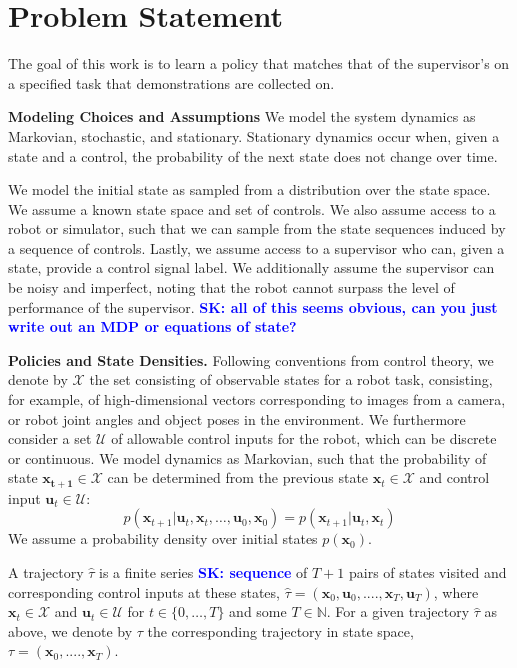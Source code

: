 \documentclass[10pt, conference]{ieeeconf}      %
\newcommand{\bu}{\mathbf{u}}
\newcommand{\bx}{\mathbf{x}}
\newcommand{\sknote}[1]{%
 {\textcolor{blue}{\textbf{SK: #1}}}{}}
\begin{document}
\section{Problem Statement}\label{sec:PS}
The goal of this work is to learn a policy that matches that of the supervisor's on a specified task that demonstrations are collected on. 

\noindent\textbf{Modeling Choices and Assumptions}  We model the system dynamics as Markovian, stochastic, and stationary. Stationary dynamics occur when, given a state and a control, the probability of the next state does not change over time. 

We model the initial state as sampled from a distribution over the state space.
We assume a known state space and set of controls. We also assume access to a robot or simulator, such that we  can sample from the state sequences induced by a sequence of controls.   Lastly, we assume access to a supervisor who can, given a state, provide a control signal label. We additionally assume the supervisor can be noisy and imperfect, noting that the robot cannot surpass the level of performance of the supervisor. 
\sknote{all of this seems obvious, can you just write out an MDP or equations of state?}


\noindent\textbf{Policies and State Densities.}
Following conventions from control theory, we denote by $\mathcal{X}$ the set consisting of observable states for a robot task, consisting, for example, of 
high-dimensional vectors corresponding to images from a camera, or robot joint angles and object poses in the environment.
We furthermore consider a set $\mathcal{U}$ of allowable control inputs for the robot, which can be discrete or
continuous. We model dynamics as Markovian, such that the probability of state $\mathbf{x_{t+1}}\in
\mathcal{X}$ can be determined from the previous state $\mathbf{x}_t\in\mathcal{X}$ and control input $\mathbf{u}_t\in
\mathcal{U}$: 
$$p(\bx_{t+1}|\bu_{t},\bx_{t}, \ldots, \bu_{0}, \bx_{0})=p(\bx_{t+1}|\bu_{t}, \bx_t)$$
We assume a probability density over initial states $p(\bx_0)$.



A trajectory $\hat{\tau}$ is a finite series\sknote{sequence} of $T+1$ pairs of states visited and corresponding
control inputs at these states, $\hat{\tau} = (\mathbf{x}_0,\mathbf{u}_0, ...., \mathbf{x}_T,\mathbf{u}_T)$, where $\bx_t\in \mathcal{X}$
and $\bu_t\in \mathcal{U}$ for $t\in \{0, \ldots, T\}$ and some $T\in \mathbb{N}$.  
For a given trajectory $\hat{\tau}$ as above, we denote by ${\tau}$ the corresponding trajectory in state space,
${\tau} = (\bx_0,....,\bx_T)$.
\end{document}

